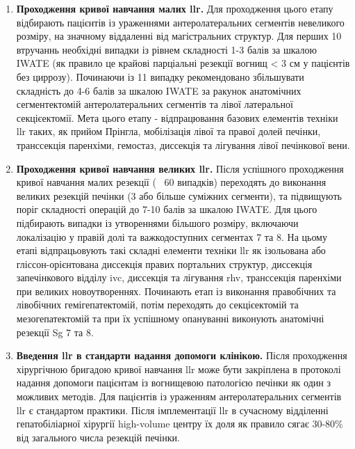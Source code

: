 \begin{refsection}
\begin{enumerate}
    \item \textbf{Проходження кривої навчання малих \acrshort{llr}.} Для проходження цього етапу відбирають пацієнтів із ураженнями антеролатеральних сегментів невеликого розміру, на значному віддаленні від магістральних структур. Для перших 10 втручаннь необхідні випадки із рівнем складності 1-3 балів за шкалою IWATE (як правило це крайові парціальні резекції вогнищ < 3 см у пацієнтів без циррозу). Починаючи із 11 випадку рекомендовано збільшувати складність до 4-6 балів за шкалою IWATE за ракунок анатомічних сегментектомій антеролатеральних сегментів та лівої латеральної секцієектомії. Мета цього етапу - відпрацювання базових елементів техніки \acrshort{llr} таких, як прийом Прінгла, мобілізація лівої та правої долей печінки, транссекція паренхіми, гемостаз, диссекція та лігування лівої печінкової вени.
    
    \item \textbf{Проходження кривої навчання великих \acrshort{llr}.} Після успішного проходження кривої навчання малих резекції (~ 60 випадків) переходять до виконання великих резекцій печінки (3 або більше суміжних сегменти), та підвищують поріг складності операцій до 7-10 балів за шкалою IWATE. Для цього підбирають випадки із утвореннями більшого розміру, включаючи локалізацію у правій долі та важкодоступних сегментах 7 та 8. На цьому етапі відпрацьовують такі складні елементи техніки \acrshort{llr} як  ізольована або гліссон-орієнтована диссекція правих портальних структур, диссекція запечінкового відділу \acrshort{ivc}, диссекція та лігування \acrshort{rhv}, транссекція паренхіми при великих новоутвореннях. Починають етап із виконання правобічних та лівобічних гемігепатектомій, потім переходять до секцієектомій та мезогепатектомій та при їх успішному опануванні виконують анатомічні резекції Sg 7 та 8. 
    
    \item \textbf{Введення \acrshort{llr} в стандарти надання допомоги клінікою.} Після проходження хірургічною бригадою кривої навчання \acrshort{llr} може бути закріплена в протоколі надання допомоги пацієнтам із вогнищевою патологією печінки як один з можливих методів. Для пацієнтів із ураженням антеролатеральних сегментів \acrshort{llr} є стандартом практики. Після імплементації \acrshort{llr} в сучасному відділенні гепатобіліарної хірургії high-volume центру їх доля як правило сягає 30-80\% від загального числа резекцій печінки. 

\end{enumerate}

\printbibliography[heading=subbibliography] 

\end{refsection}